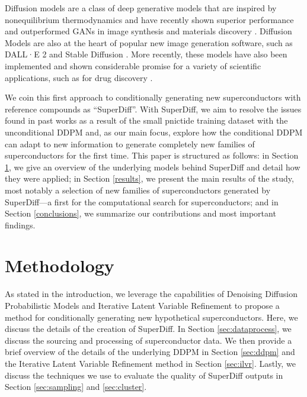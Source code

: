 \documentclass[%
reprint,
 amsmath,amssymb,
 aps,
prb,
]{revtex4-2}
\begin{document}
Diffusion models are a class of deep generative models that are inspired by nonequilibrium thermodynamics \cite{pmlr-v37-sohl-dickstein15} and have recently shown superior performance and outperformed GANs in image synthesis \cite{dhariwal2021diffusion} and materials discovery \cite{alversonGANandDiff2022}. Diffusion Models are also at the heart of popular new image generation software, such as DALL·E 2 \cite{ramesh2022hierarchical} and Stable Diffusion \cite{rombach2021highresolution}. More recently, these models have also been implemented and shown considerable promise for a variety of scientific applications, such as for drug discovery \cite{corso2023diffdock}.

We coin this first approach to conditionally generating new superconductors with reference compounds as ``SuperDiff''. With SuperDiff, we aim to resolve the issues found in past works as a result of the small pnictide training dataset with the unconditional DDPM and, as our main focus, explore how the conditional DDPM can adapt to new information to generate completely new families of superconductors for the first time. This paper is structured as follows: in Section \ref{methodology}, we give an overview of the underlying models behind SuperDiff and detail how they were applied; in Section \ref{results}, we present the main results of the study, most notably a selection of new families of superconductors generated by SuperDiff---a first for the computational search for superconductors; and in Section \ref{conclusions}, we summarize our contributions and most important findings.


\section{Methodology}
\label{methodology}

As stated in the introduction, we leverage the capabilities of Denoising Diffusion Probabilistic Models and Iterative Latent Variable Refinement to propose a method for conditionally generating new hypothetical superconductors. Here, we discuss the details of the creation of SuperDiff. In Section \ref{sec:dataprocess}, we discuss the sourcing and processing of superconductor data. We then provide a brief overview of the details of the underlying DDPM in Section \ref{sec:ddpm} and the Iterative Latent Variable Refinement method in Section \ref{sec:ilvr}. Lastly, we discuss the techniques we use to evaluate the quality of SuperDiff outputs in Section \ref{sec:sampling} and \ref{sec:cluster}.
\end{document}
